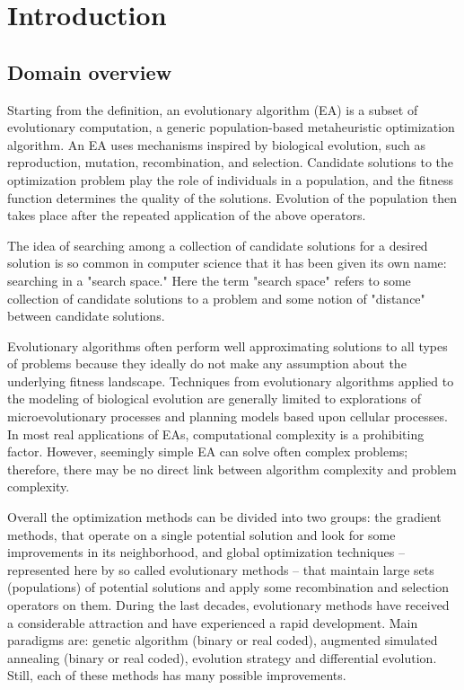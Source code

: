 \chapter{Introduction}

\section{Domain overview}

Starting from the definition, an evolutionary algorithm (EA) is a subset of evolutionary computation, a generic population-based metaheuristic optimization algorithm. An EA uses mechanisms inspired by biological evolution, such as reproduction, mutation, recombination, and selection. Candidate solutions to the optimization problem play the role of individuals in a population, and the fitness function determines the quality of the solutions. Evolution of the population then takes place after the repeated application of the above operators.

The idea of searching among a collection of candidate solutions for a desired solution is so common in computer science that it has been given its own name: searching in a "search space." Here the term "search space" refers to some collection of candidate solutions to a problem and some notion of "distance" between candidate solutions. \cite{introduction_to_ga}

Evolutionary algorithms often perform well approximating solutions to all types of problems because they ideally do not make any assumption about the underlying fitness landscape. Techniques from evolutionary algorithms applied to the modeling of biological evolution are generally limited to explorations of microevolutionary processes and planning models based upon cellular processes. In most real applications of EAs, computational complexity is a prohibiting factor. However, seemingly simple EA can solve often complex problems; therefore, there may be no direct link between algorithm complexity and problem complexity.

Overall the optimization methods can be divided into two groups: the gradient methods, that operate on a single potential solution and look for some improvements in its neighborhood, and global optimization techniques – represented here by so called evolutionary methods – that maintain large sets (populations) of potential solutions and apply some recombination and selection operators on them. During the last decades, evolutionary methods have received a considerable attraction and have experienced a rapid development. Main paradigms are: genetic algorithm (binary or real coded), augmented simulated annealing (binary or real coded), evolution strategy and differential evolution. Still, each of these methods has many possible improvements.

